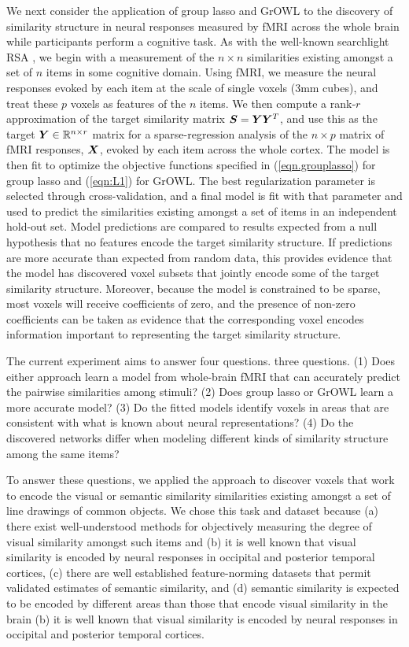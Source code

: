 We next consider the application of group lasso and GrOWL to the discovery of
similarity structure in neural responses measured by fMRI across the whole brain
while participants perform a cognitive task. As with the well-known searchlight
RSA \citep{RSA}, we begin with a measurement of the $n \times n $ similarities
existing amongst a set of $n$ items in some cognitive domain.  Using fMRI, we
measure the neural responses evoked by each item at the scale of single voxels
(3mm cubes), and treat these $p$ voxels as features of the $n$ items. We then
compute a rank-$r$ approximation of the target similarity matrix $\boldsymbol{S} = \boldsymbol{Y}
\boldsymbol{Y}^T$, and use this as the target $\boldsymbol{Y} \in {\mathbb R}^{n \times r} $ matrix for a
sparse-regression analysis of the $n \times p$ matrix of fMRI responses, $\boldsymbol{X}$,
evoked by each item across the whole cortex. The model is then fit to optimize
the objective functions specified in (\ref{eqn.grouplasso}) for group lasso and
(\ref{eqn:L1}) for GrOWL. The best regularization parameter is selected through
cross-validation, and a final model is fit with that parameter and used to
predict the similarities existing amongst a set of items in an independent
hold-out set. Model predictions are compared to results expected from a null
hypothesis that no features encode the target similarity structure. If
predictions are more accurate than expected from random data, this provides
evidence that the model has discovered voxel subsets that jointly encode some of
the target similarity structure. Moreover, because the model is constrained to
be sparse, most voxels will receive coefficients of zero, and the presence of
non-zero coefficients can be taken as evidence that the corresponding voxel
encodes information important to representing the target similarity structure.

The current experiment aims to answer
\ifdefined\SEMANTIC
four questions.
\else
three questions.
\fi%
(1) Does either approach learn a model from whole-brain fMRI that can accurately
predict the pairwise similarities among stimuli?  (2) Does group lasso or GrOWL
learn a more accurate model?  (3) Do the fitted models identify voxels in areas
that are consistent with what is known about neural representations?
\ifdefined\SEMANTIC
(4) Do the discovered networks differ when modeling different kinds of
similarity structure among the same items?
\fi%

To answer these questions, we applied the approach to discover voxels that work
to encode the visual or semantic similarity similarities existing amongst a set
of line drawings of common objects. We chose this task and dataset because (a)
there exist well-understood methods for objectively measuring the degree of
visual similarity amongst such items \citep{antani02} and
\ifdefined\SEMANTIC
(b) it is well known that visual similarity is encoded by neural responses in
occipital and posterior temporal cortices, (c) there are well established
feature-norming datasets that permit validated estimates of semantic similarity,
and (d) semantic similarity is expected to be encoded by different areas than
those that encode visual similarity in the brain
\else
(b) it is well known that visual similarity is encoded by neural responses in
occipital and posterior temporal cortices.
\fi%

